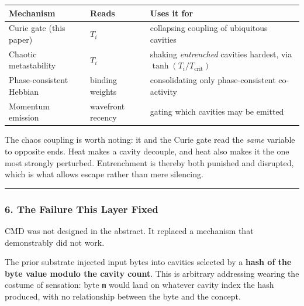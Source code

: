 \documentclass[
  11pt,
  a4paper,
]{article}
\begin{document}
\begin{longtable}[]{@{}
  >{\raggedright\arraybackslash}p{}
  >{\raggedright\arraybackslash}p{}
  >{\raggedright\arraybackslash}p{}@{}}
\toprule\noalign{}
\begin{minipage}[b]{\linewidth}\raggedright
Mechanism
\end{minipage} & \begin{minipage}[b]{\linewidth}\raggedright
Reads
\end{minipage} & \begin{minipage}[b]{\linewidth}\raggedright
Uses it for
\end{minipage} \\
\midrule\noalign{}
\endhead
\bottomrule\noalign{}
\endlastfoot
Curie gate (this paper) & \(T_i\) & collapsing coupling of ubiquitous
cavities \\
Chaotic metastability & \(T_i\) & shaking \emph{entrenched} cavities
hardest, via \(\tanh(T_i/T_{\text{crit}})\) \\
Phase-consistent Hebbian & binding weights & consolidating only
phase-consistent co-activity \\
Momentum emission & wavefront recency & gating which cavities may be
emitted \\
\end{longtable}

The chaos coupling is worth noting: it and the Curie gate read the
\emph{same} variable to opposite ends. Heat makes a cavity decouple, and
heat also makes it the one most strongly perturbed. Entrenchment is
thereby both punished and disrupted, which is what allows escape rather
than mere silencing.

\begin{center}\rule{0.5\linewidth}{0.5pt}\end{center}

\subsubsection{6. The Failure This Layer
Fixed}\label{the-failure-this-layer-fixed}

CMD was not designed in the abstract. It replaced a mechanism that
demonstrably did not work.

The prior substrate injected input bytes into cavities selected by a
\textbf{hash of the byte value modulo the cavity count}. This is
arbitrary addressing wearing the costume of sensation: byte \texttt{m}
would land on whatever cavity index the hash produced, with no
relationship between the byte and the concept.
\end{document}
